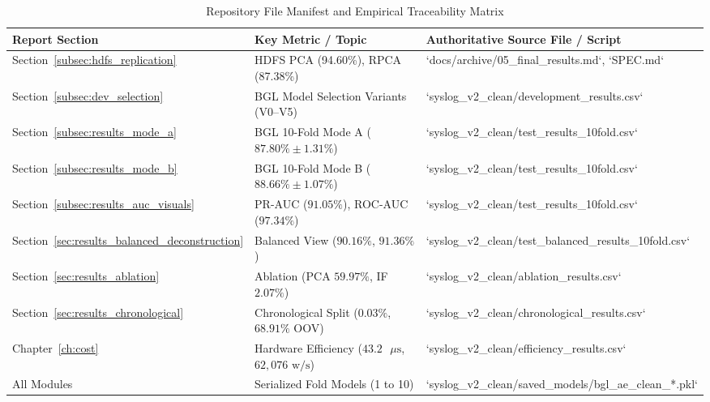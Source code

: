 \begin{table}[htbp]
\centering
\caption{Repository File Manifest and Empirical Traceability Matrix}
\label{tab:file_manifest}
\begin{tabular}{lll}
\toprule
\textbf{Report Section} & \textbf{Key Metric / Topic} & \textbf{Authoritative Source File / Script} \\
\midrule
Section~\ref{subsec:hdfs_replication} & HDFS PCA (94.60\%), RPCA (87.38\%) & `docs/archive/05_final_results.md`, `SPEC.md` \\
Section~\ref{subsec:dev_selection} & BGL Model Selection Variants (V0--V5) & `syslog_v2_clean/development_results.csv` \\
Section~\ref{subsec:results_mode_a} & BGL 10-Fold Mode A ($87.80\% \pm 1.31\%$) & `syslog_v2_clean/test_results_10fold.csv` \\
Section~\ref{subsec:results_mode_b} & BGL 10-Fold Mode B ($88.66\% \pm 1.07\%$) & `syslog_v2_clean/test_results_10fold.csv` \\
Section~\ref{subsec:results_auc_visuals} & PR-AUC ($91.05\%$), ROC-AUC ($97.34\%$) & `syslog_v2_clean/test_results_10fold.csv` \\
Section~\ref{sec:results_balanced_deconstruction} & Balanced View ($90.16\%$, $91.36\%$) & `syslog_v2_clean/test_balanced_results_10fold.csv` \\
Section~\ref{sec:results_ablation} & Ablation (PCA $59.97\%$, IF $2.07\%$) & `syslog_v2_clean/ablation_results.csv` \\
Section~\ref{sec:results_chronological} & Chronological Split ($0.03\%$, $68.91\%$ OOV) & `syslog_v2_clean/chronological_results.csv` \\
Chapter~\ref{ch:cost} & Hardware Efficiency ($43.2\text{ }\mu\text{s}$, $62,076\text{ w/s}$) & `syslog_v2_clean/efficiency_results.csv` \\
All Modules & Serialized Fold Models (1 to 10) & `syslog_v2_clean/saved_models/bgl_ae_clean_*.pkl` \\
\bottomrule
\end{tabular}
\end{table}

